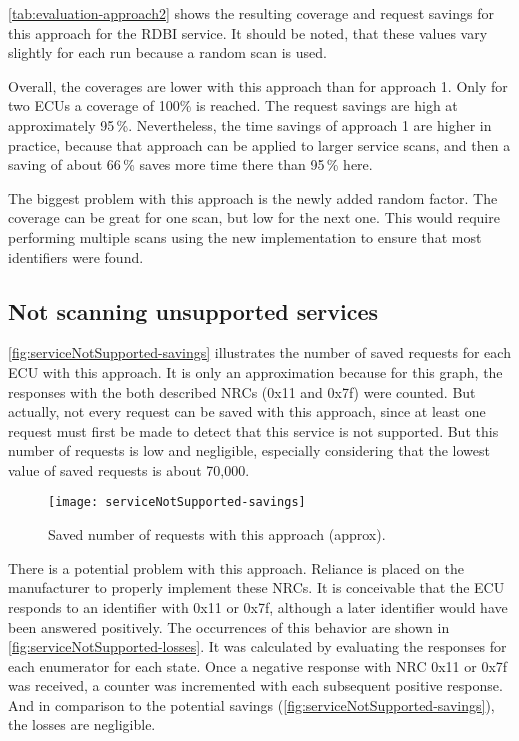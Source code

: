 \autoref{tab:evaluation-approach2} shows the resulting coverage and request savings for this approach for the RDBI service. 
It should be noted, that these values vary slightly for each run because a random scan is used.

Overall, the coverages are lower with this approach than for approach 1. 
Only for two ECUs a coverage of 100\% is reached. 
The request savings are high at approximately 95\,\%. 
Nevertheless, the time savings of approach 1 are higher in practice, because that approach can be applied to larger service scans, and then a saving of about 66\,\% saves more time there than 95\,\% here.

The biggest problem with this approach is the newly added random factor. 
The coverage can be great for one scan, but low for the next one. 
This would require performing multiple scans using the new implementation to ensure that most identifiers were found.

\subsection{Not scanning unsupported services}

\autoref{fig:serviceNotSupported-savings} illustrates the number of saved requests for each ECU with this approach. 
It is only an approximation because for this graph, the responses with the both described NRCs (0x11 and 0x7f) were counted. But actually, not every request can be saved with this approach, since at least one request must first be made to detect that this service is not supported. But this number of requests is low and negligible, especially considering that the lowest value of saved requests is about 70,000.

\begin{figure}[htb]
    \centering
    \texttt{[image: serviceNotSupported-savings]}
    \caption{Saved number of requests with this approach (approx).}
    \label{fig:serviceNotSupported-savings}
\end{figure}

There is a potential problem with this approach. 
Reliance is placed on the manufacturer to properly implement these NRCs. 
It is conceivable that the ECU responds to an identifier with 0x11 or 0x7f, although a later identifier would have been answered positively. The occurrences of this behavior are shown in \autoref{fig:serviceNotSupported-losses}. It was calculated by evaluating the responses for each enumerator for each state. Once a negative response with NRC 0x11 or 0x7f was received, a counter was incremented with each subsequent positive response.
And in comparison to the potential savings (\autoref{fig:serviceNotSupported-savings}), the losses are negligible.

